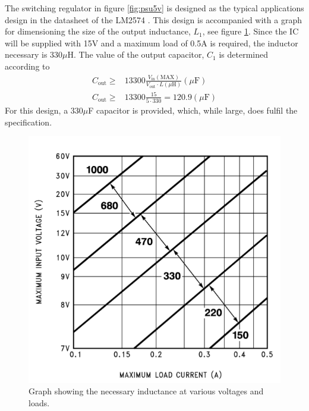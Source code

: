 The switching regulator in figure \ref{fig:psu5v} is designed as the typical applications design in the datasheet of the LM2574 \cite{lm2574}. This design is accompanied with a graph for dimensioning the size of the output inductance, $L_1$, see figure \ref{fig:inductorselect}. Since the IC will be supplied with 15V and a maximum load of 0.5A is required, the inductor necessary is 330$\mu$H. The value of the output capacitor, $C_1$ is determined according to 
\begin{eqnarray}
	C_\text{out}\geq&13300\frac{V_\text{in}(\text{MAX})}{V_\text{out}\cdot L(\mu\text{H})}(\mu\text{F})\\
	C_\text{out}\geq&13300\frac{15}{5\cdot 330} = 120.9(\mu\text{F})
\end{eqnarray} 
For this design, a 330$\mu$F capacitor is provided, which, while large, does fulfil the specification.
\begin{figure}
	\centering
	\includegraphics[width=.6\linewidth]{images/inductorselector}
	\caption{Graph showing the necessary inductance at various voltages and loads.}
	\label{fig:inductorselect}
\end{figure}